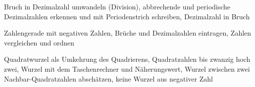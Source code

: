 \setcounter{aufgabe}{0}

\begin{aufgabe}{Bruch in Dezimalzahl umwandeln (Division), abbrechende und periodische Dezimalzahlen erkennen und mit Periodenstrich schreiben, Dezimalzahl in Bruch}
\end{aufgabe}

\begin{aufgabe}{Zahlengerade mit negativen Zahlen, Brüche und Dezimalzahlen eintragen, Zahlen vergleichen und ordnen}
\end{aufgabe}

\begin{aufgabe}{Quadratwurzel als Umkehrung des Quadrierens, Quadratzahlen bis zwanzig hoch zwei, Wurzel mit dem Taschenrechner und Näherungswert, Wurzel zwischen zwei Nachbar-Quadratzahlen abschätzen, keine Wurzel aus negativer Zahl}
\end{aufgabe}

